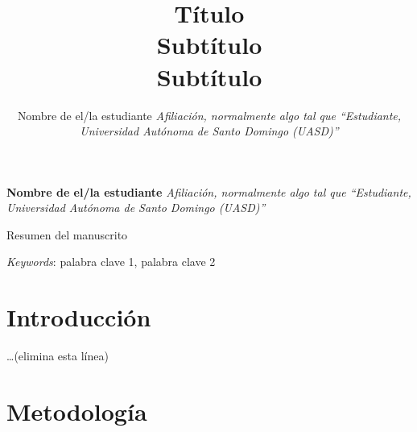 \documentclass[11pt,]{article}
\title{Título\\
Subtítulo\\
Subtítulo  }
\author{\Large Nombre de el/la
estudiante\vspace{0.05in} \newline\normalsize\emph{Afiliación,
normalmente algo tal que ``Estudiante, Universidad Autónoma de Santo
Domingo (UASD)''}  }
\date{}
\newcommand*{\authorfont}{\fontfamily{phv}\selectfont}
\renewenvironment{abstract}
 {{%
    \setlength{\leftmargin}{0mm}
    \setlength{\rightmargin}{\leftmargin}%
  }%
  \relax}
 {\endlist}
\begin{document}
%

{%
\setlength{\parindent}{0pt}
\thispagestyle{plain}
{\fontsize{18}{20}\selectfont\raggedright
\maketitle  %

}

{
   \vskip 13.5pt\relax \normalsize\fontsize{11}{12}
\textbf{\authorfont Nombre de el/la
estudiante} \hskip 15pt \emph{\small Afiliación, normalmente algo tal
que ``Estudiante, Universidad Autónoma de Santo Domingo (UASD)''}   

}

}








\begin{abstract}

    \hbox{\vrule height .2pt width 39.14pc}

    \vskip 8.5pt %

\noindent Resumen del manuscrito


\vskip 8.5pt \noindent \emph{Keywords}: palabra clave 1, palabra clave
2 \par

    \hbox{\vrule height .2pt width 39.14pc}



\end{abstract}


\vskip -8.5pt



\noindent 

\hypertarget{introducciuxf3n}{%
\section{Introducción}\label{introducciuxf3n}}

\ldots (elimina esta línea)

\hypertarget{metodologuxeda}{%
\section{Metodología}\label{metodologuxeda}}
\end{document}
